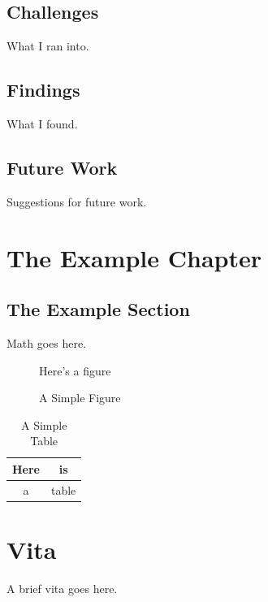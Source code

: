 \documentclass[final]{ukthesis}
\begin{document}
\section{Challenges}
What I ran into.

\section{Findings}
What I found.

\section{Future Work}
Suggestions for future work.





%
%
%
\chapter{The Example Chapter}
\section{The Example Section}
Math goes here.
\begin{figure}[h]
\centering
Here's a figure
\caption{A Simple Figure}
\end{figure}
\begin{table}[h]
\centering
\begin{tabular}{c|c}
Here & is \\
\hline
a & table
\end{tabular}
\caption{A Simple Table}
\end{table}
\copyrightnotice
\backmatter

\chapter{Vita}
A brief vita goes here.
\end{document}
